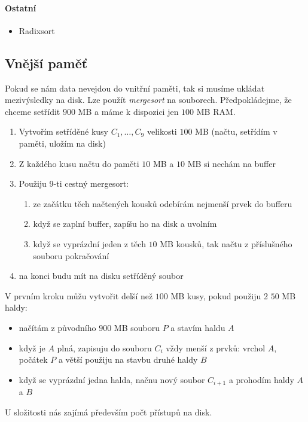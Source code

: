 \documentclass[a4paper]{article}      %
\begin{document}
\paragraph{Ostatní}
\begin{itemize}
\item Radixsort
\end{itemize}

\subsection{Vnější paměť}
Pokud se nám data nevejdou do vnitřní paměti, tak si musíme ukládat mezivýsledky na disk. Lze použít \emph{mergesort} na souborech.
Předpokládejme, že chceme setřídit $900$ MB a máme k dispozici jen $100$ MB RAM.
\begin{enumerate}
\item Vytvořím setříděné kusy $C_1,\ldots,C_9$ velikosti $100$ MB (načtu, setřídím v paměti, uložím na disk)
\item Z každého kusu načtu do paměti $10$ MB a $10$ MB si nechám na buffer
\item Použiju 9-ti cestný mergesort:
	\begin{enumerate}
	\item ze začátku těch načtených kousků odebírám nejmenší prvek do bufferu
	\item když se zaplní buffer, zapíšu ho na disk a uvolním
	\item když se vyprázdní jeden z těch $10$ MB kousků, tak načtu z příslušného souboru pokračování
	\end{enumerate}
\item na konci budu mít na disku setříděný soubor
\end{enumerate} 
V prvním kroku můžu vytvořit delší než $100$ MB kusy, pokud použiju 2 $50$ MB haldy:
\begin{itemize}
\item načítám z původního $900$ MB souboru $P$ a stavím haldu $A$
\item když je $A$ plná, zapisuju do souboru $C_i$ vždy menší z prvků: vrchol $A$, počátek $P$ a větší použiju na stavbu druhé haldy $B$
\item když se vyprázdní jedna halda, načnu nový soubor $C_{i+1}$ a prohodím haldy $A$ a $B$  
\end{itemize}
U složitosti nás zajímá především počt přístupů na disk.
\end{document}

